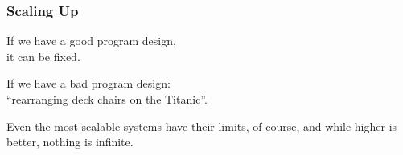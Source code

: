 \begin{frame}
\frametitle{Scaling Up}
\Large

If we have a good program design,\\
it can be fixed. 

If we have a bad program design: \\
``rearranging deck chairs on the Titanic''.

Even the most scalable systems have their limits, of course, and while higher is better, nothing is infinite.

\end{frame}







